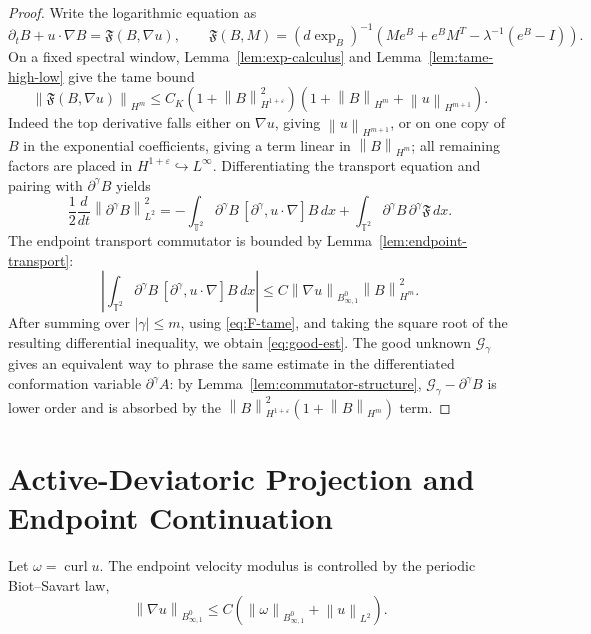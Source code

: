 \documentclass[11pt]{article}
\newcommand{\T}{\mathbb T}
\newcommand{\Id}{I}
\newcommand{\curl}{\operatorname{curl}}
\newcommand{\calG}{\mathcal G}
\newcommand{\eps}{\varepsilon}
\newcommand{\norm}[1]{\left\lVert #1\right\rVert}
\newcommand{\Besov}{B^0_{\infty,1}}
\begin{document}
\begin{proof}
Write the logarithmic equation as
\[
  \partial_tB+u\cdot\nabla B
  =
  \mathfrak F(B,\nabla u),
  \qquad
  \mathfrak F(B,M)
  =
  (d\exp_B)^{-1}
  \left(Me^B+e^BM^T-\lambda^{-1}(e^B-\Id)\right).
\]
On a fixed spectral window, Lemma~\ref{lem:exp-calculus} and
Lemma~\ref{lem:tame-high-low} give the tame bound
\[
  \norm{\mathfrak F(B,\nabla u)}_{H^m}
  \le
  C_K\left(1+\norm{B}_{H^{1+\eps}}^2\right)
  \left(1+\norm{B}_{H^m}+\norm{u}_{H^{m+1}}\right).
  \label{eq:F-tame}
\]
Indeed the top derivative falls either on \(\nabla u\), giving
\(\norm{u}_{H^{m+1}}\), or on one copy of \(B\) in the exponential
coefficients, giving a term linear in \(\norm{B}_{H^m}\); all remaining factors
are placed in \(H^{1+\eps}\hookrightarrow L^\infty\).  Differentiating the
transport equation and pairing with \(\partial^\gamma B\) yields
\[
  \frac12\frac{d}{dt}\norm{\partial^\gamma B}_{L^2}^2
  =
  -\int_{\T^2}\partial^\gamma B\,
  [\partial^\gamma,u\cdot\nabla]B\,dx
  +
  \int_{\T^2}\partial^\gamma B\,\partial^\gamma\mathfrak F\,dx .
\]
The endpoint transport commutator is bounded by Lemma~\ref{lem:endpoint-transport}:
\[
  \left|
  \int_{\T^2}\partial^\gamma B\,
  [\partial^\gamma,u\cdot\nabla]B\,dx
  \right|
  \le
  C\norm{\nabla u}_{\Besov}\norm{B}_{H^m}^2 .
\]
After summing over \(|\gamma|\le m\), using \eqref{eq:F-tame}, and taking the
square root of the resulting differential inequality, we obtain
\eqref{eq:good-est}.  The good unknown \(\calG_\gamma\) gives an equivalent
way to phrase the same estimate in the differentiated conformation variable
\(\partial^\gamma A\): by Lemma~\ref{lem:commutator-structure},
\(\calG_\gamma-\partial^\gamma B\) is lower order and is absorbed by the
\(\norm{B}_{H^{1+\eps}}^2(1+\norm{B}_{H^m})\) term.
\end{proof}

\section{Active-Deviatoric Projection and Endpoint Continuation}
\label{sec:criterion}

Let \(\omega=\curl u\).  The endpoint velocity modulus is controlled by the
periodic Biot--Savart law,
\[
  \norm{\nabla u}_{B^0_{\infty,1}}
  \le C\left(\norm{\omega}_{B^0_{\infty,1}}+\norm{u}_{L^2}\right).
\]
\end{document}
